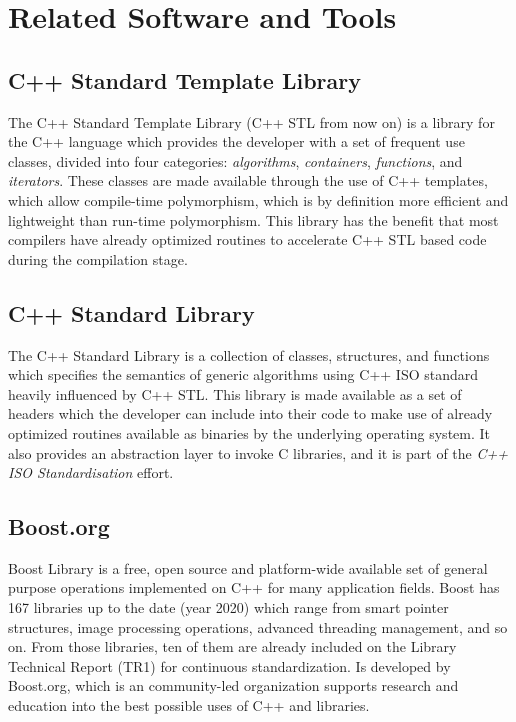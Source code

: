 \section{Related Software and Tools}

\subsection{C++ Standard Template Library}
The C++ Standard Template Library (C++ STL from now on) is a library for the C++ language which provides the developer with a set of frequent use classes, divided into four categories: \textit{algorithms}, \textit{containers}, \textit{functions}, and \textit{iterators}. These classes are made available through the use of C++ templates, which allow compile-time polymorphism, which is by definition more efficient and lightweight than run-time polymorphism. This library has the benefit that most compilers have already optimized routines to accelerate C++ STL based code during the compilation stage.

\subsection{C++ Standard Library}
The C++ Standard Library is a collection of classes, structures, and functions which specifies the semantics of generic algorithms using C++ ISO standard heavily influenced by C++ STL. This library is made available as a set of headers which the developer can include into their code to make use of already optimized routines available as binaries by the underlying operating system. It also provides an abstraction layer to invoke C libraries, and it is part of the \textit{C++ ISO Standardisation} effort.

\subsection{Boost.org}
Boost Library is a free, open source and platform-wide available set of general purpose operations implemented on C++ for many application fields. Boost has 167 libraries up to the date (year 2020) which range from smart pointer structures, image processing operations, advanced threading management, and so on. From those libraries, ten of them are already included on the Library Technical Report (TR1) for continuous standardization. Is developed by Boost.org, which is an community-led organization supports research and education into the best possible uses of C++ and libraries.

